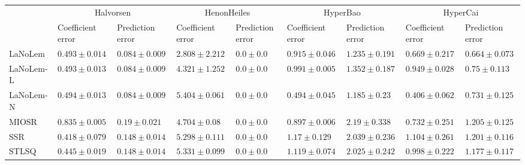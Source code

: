 \begin{table*}
{\begin{tabular}{lllllllll}
 & \multicolumn{2}{c}{Halvorsen} & \multicolumn{2}{c}{HenonHeiles} & \multicolumn{2}{c}{HyperBao} & \multicolumn{2}{c}{HyperCai} \\
 & Coefficient error & Prediction error & Coefficient error & Prediction error & Coefficient error & Prediction error & Coefficient error & Prediction error \\
\midrule
LaNoLem & $0.493\pm 0.014$ & $0.084\pm 0.009$ & $\mathbf{2.808}\pm 2.212$ & $0.0\pm 0.0$ & $0.915\pm 0.046$ & $1.235\pm 0.191$ & $0.669\pm 0.217$ & $\mathbf{0.664}\pm 0.073$ \\
LaNoLem-L & $0.493\pm 0.013$ & $\mathbf{0.084}\pm 0.009$ & $4.321\pm 1.252$ & $0.0\pm 0.0$ & $0.991\pm 0.005$ & $1.352\pm 0.187$ & $0.949\pm 0.028$ & $0.75\pm 0.113$ \\
LaNoLem-N & $0.494\pm 0.013$ & $0.084\pm 0.009$ & $5.404\pm 0.061$ & $\mathbf{0.0}\pm 0.0$ & $\mathbf{0.494}\pm 0.045$ & $\mathbf{1.185}\pm 0.23$ & $\mathbf{0.406}\pm 0.062$ & $0.731\pm 0.125$ \\
MIOSR & $0.835\pm 0.005$ & $0.19\pm 0.021$ & $4.704\pm 0.08$ & $0.0\pm 0.0$ & $0.897\pm 0.006$ & $2.19\pm 0.338$ & $0.732\pm 0.251$ & $1.205\pm 0.125$ \\
SSR & $\mathbf{0.418}\pm 0.079$ & $0.148\pm 0.014$ & $5.298\pm 0.111$ & $0.0\pm 0.0$ & $1.17\pm 0.129$ & $2.039\pm 0.236$ & $1.104\pm 0.261$ & $1.201\pm 0.116$ \\
STLSQ & $0.445\pm 0.019$ & $0.148\pm 0.014$ & $5.331\pm 0.099$ & $0.0\pm 0.0$ & $1.119\pm 0.074$ & $2.025\pm 0.242$ & $0.998\pm 0.222$ & $1.177\pm 0.117$ \\

\midrule


\end{tabular}}
\end{table*}
